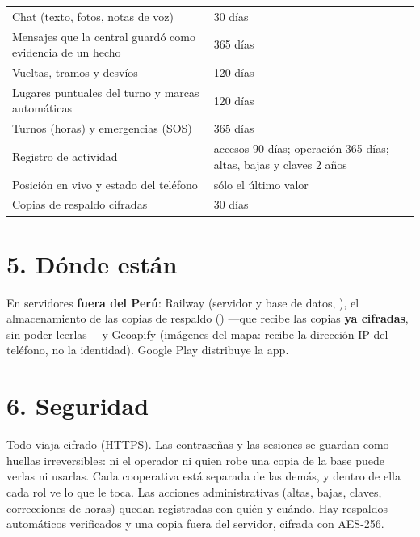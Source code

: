 \documentclass[10.5pt,a4paper]{article}
\begin{document}
\begin{tabularx}{\linewidth}{>{\raggedright}p{8.4cm}X}
\toprule
Chat (texto, fotos, notas de voz) & 30 días\\
Mensajes que la central guardó como evidencia de un hecho & 365 días\\
Vueltas, tramos y desvíos & 120 días\\
Lugares puntuales del turno y marcas automáticas & 120 días\\
Turnos (horas) y emergencias (SOS) & 365 días\\
Registro de actividad & accesos 90 días; operación 365 días; altas, bajas y claves 2 años\\
Posición en vivo y estado del teléfono & sólo el último valor\\
Copias de respaldo cifradas & 30 días\\
\bottomrule
\end{tabularx}

\section{5. Dónde están}
En servidores \textbf{fuera del Perú}: Railway (servidor y base de datos,
), el almacenamiento de las copias de respaldo
() ---que recibe las copias \textbf{ya cifradas},
sin poder leerlas--- y Geoapify (imágenes del mapa: recibe la dirección IP del
teléfono, no la identidad). Google Play distribuye la app.

\section{6. Seguridad}
Todo viaja cifrado (HTTPS). Las contraseñas y las sesiones se guardan como
huellas irreversibles: ni el operador ni quien robe una copia de la base
puede verlas ni usarlas. Cada cooperativa está separada de las demás, y
dentro de ella cada rol ve lo que le toca. Las acciones administrativas
(altas, bajas, claves, correcciones de horas) quedan registradas con quién y
cuándo. Hay respaldos automáticos verificados y una copia fuera del servidor,
cifrada con AES-256.
\end{document}
